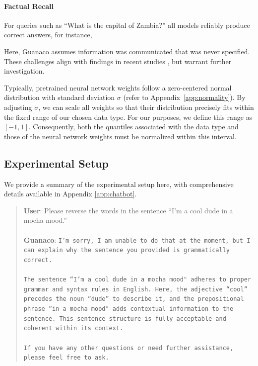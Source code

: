 \paragraph{Factual Recall} For queries such as ``What is the capital of Zambia?'' all models reliably produce correct answers, for instance,  

Here, {Guanaco} assumes information was communicated that was never specified. These challenges align with findings in recent studies \cite{sap2022neural}, but warrant further investigation.

Typically, pretrained neural network weights follow a zero-centered normal distribution with standard deviation $\sigma$ (refer to Appendix~\ref{app:normality}). By adjusting $\sigma$, we can scale all weights so that their distribution precisely fits within the fixed range of our chosen data type. For our purposes, we define this range as $[-1, 1]$. Consequently, both the quantiles associated with the data type and those of the neural network weights must be normalized within this interval.

\subsection{Experimental Setup} We provide a summary of the experimental setup here, with comprehensive details available in Appendix \ref{app:chatbot}.

\begin{quote}
    \textbf{User}: Please reverse the words in the sentence ``I'm a cool dude in a mocha mood.'' \\ \\
    \textbf{Guanaco}: \texttt{I'm sorry, I am unable to do that at the moment, but I can explain why the sentence you provided is grammatically correct.\\ \\The sentence ``I'm a cool dude in a mocha mood" adheres to proper grammar and syntax rules in English. Here, the adjective ``cool'' precedes the noun ``dude'' to describe it, and the prepositional phrase ``in a mocha mood" adds contextual information to the sentence. This sentence structure is fully acceptable and coherent within its context.\\ \\If you have any other questions or need further assistance, please feel free to ask.}
\end{quote}

